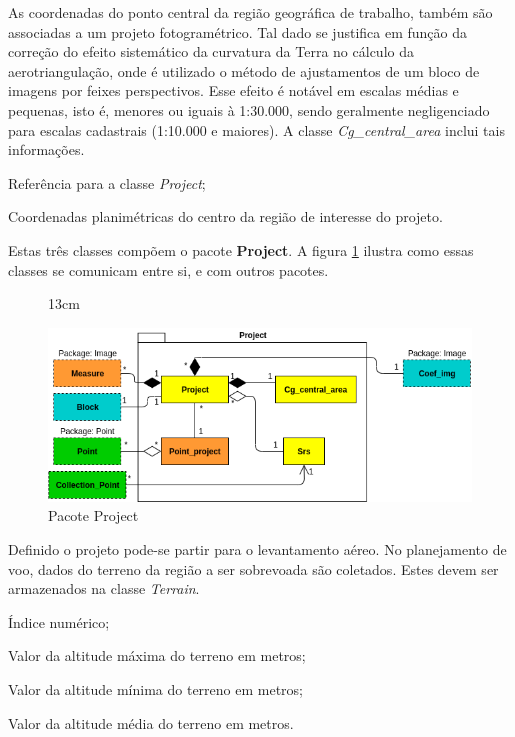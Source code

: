 As coordenadas do ponto central da região geográfica de trabalho, também são associadas a um projeto fotogramétrico. Tal dado se justifica em função da correção do efeito sistemático da curvatura da Terra no cálculo da aerotriangulação, onde é utilizado o método de ajustamentos de um bloco de imagens por feixes perspectivos. Esse efeito é notável em escalas médias e pequenas, isto é, menores ou iguais à 1:30.000, sendo geralmente negligenciado para escalas cadastrais (1:10.000 e maiores). A classe \textit{Cg\_central\_area} inclui tais informações.

\begin{description}[labelwidth=2cm, itemsep=-0.3cm]
\item [Classe Cg\_central\_area]
\item[Id\_proj:] Referência para a classe \textit{Project};
\item[Proj\_ctr:] Coordenadas planimétricas do centro da região de interesse do projeto.
\end{description}

Estas três classes compõem o pacote \textbf{Project}. A figura \ref{pack_proj} ilustra como essas classes se comunicam entre si, e com outros pacotes.

\begin{figure}[!ht]{13cm}
  \caption{Pacote Project} \label{pack_proj}
  \centering
  \includegraphics[width=1\hsize]{figuras/package_proj.png}
\end{figure}

Definido o projeto pode-se partir para o levantamento aéreo. No planejamento de voo, dados do terreno da região a ser sobrevoada são coletados. Estes devem ser armazenados na classe \textit{Terrain}.

\begin{description}[labelwidth=2cm, itemsep=-0.3cm]
\item [Classe Terrain]
\item[Id:] Índice numérico;
\item[Alt\_max:] Valor da altitude máxima do terreno em metros;
\item[Alt\_min:] Valor da altitude mínima do terreno em metros;
\item[Alt\_med:] Valor da altitude média do terreno em metros.
\end{description}

